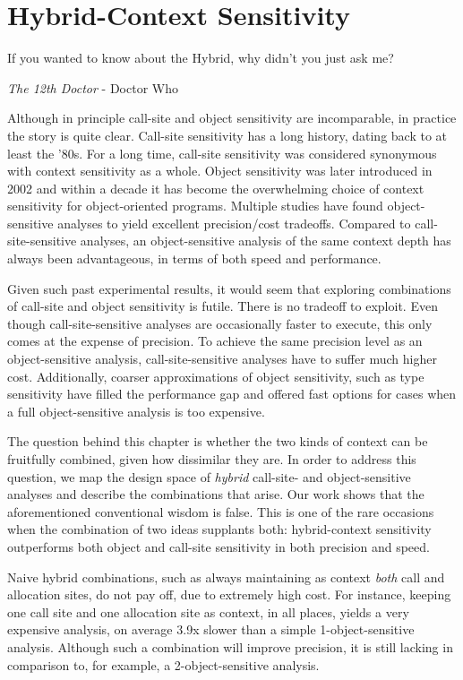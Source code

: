 \chapter{Hybrid-Context Sensitivity}
\label{chapter:hybrid}
\epigraph{If you wanted to know about the Hybrid, why didn’t you just ask me?}{\textit{The 12th Doctor} - Doctor Who}

Although in principle call-site and object sensitivity are incomparable, in practice the story is quite clear. Call-site sensitivity has a long history, dating back to at least the '80s. For a long time, call-site sensitivity was considered synonymous with context sensitivity as a whole. Object sensitivity was later introduced in 2002 \cite{issta:2002:Milanova} and within a decade it has become the overwhelming choice of context sensitivity for object-oriented programs. Multiple studies \cite{pldi:2006:Naik,paste:2005:Liang,thesis:Lhotak,article:2008:tosem:Lhotak,oopsla:2009:Bravenboer} have found object-sensitive analyses to yield excellent precision/cost tradeoffs. Compared to call-site-sensitive analyses, an object-sensitive analysis of the same context depth has always been advantageous, in terms of both speed and performance.

Given such past experimental results, it would seem that exploring combinations of call-site and object sensitivity is futile. There is no tradeoff to exploit. Even though call-site-sensitive analyses are occasionally faster to execute, this only comes at the expense of precision. To achieve the same precision level as an object-sensitive analysis, call-site-sensitive analyses have to suffer much higher cost. Additionally, coarser approximations of object sensitivity, such as type sensitivity \cite{popl:2011:Smaragdakis} have filled the performance gap and offered fast options for cases when a full object-sensitive analysis is too expensive.

The question behind this chapter is whether the two kinds of context can be fruitfully combined, given how dissimilar they are. In order to address this question, we map the design space of \emph{hybrid} call-site- and object-sensitive analyses and describe the combinations that arise. Our work shows that the aforementioned conventional wisdom is false. This is one of the rare occasions when the combination of two ideas supplants both: hybrid-context sensitivity outperforms both object and call-site sensitivity in both precision and speed.

Naive hybrid combinations, such as always maintaining as context \emph{both} call and allocation sites, do not pay off, due to extremely high cost. For instance, keeping one call site and one allocation site as context, in all places, yields a very expensive analysis, on average 3.9x slower than a simple 1-object-sensitive analysis. Although such a combination will improve precision, it is still lacking in comparison to, for example, a 2-object-sensitive analysis.

